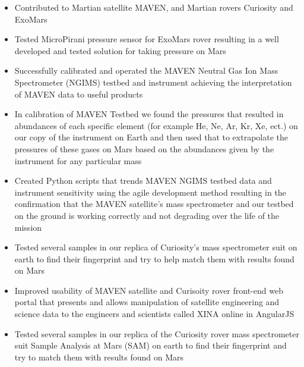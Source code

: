 \documentclass{res}
\begin{document}
\begin{resume}
\begin{itemize}
                \item Contributed to Martian satellite MAVEN, and Martian rovers Curiosity and ExoMars
		\item Tested MicroPirani pressure sensor for ExoMars rover resulting in a well developed and tested solution for taking pressure on Mars
		\item Successfully calibrated and operated the MAVEN Neutral Gas Ion Mass Spectrometer (NGIMS) testbed and instrument  achieving the interpretation of MAVEN data to useful products
		\item In calibration of MAVEN Testbed we found the pressures that resulted in abundances of each specific element (for example He, Ne, Ar, Kr, Xe, ect.) on our copy of the instrument on Earth and then used that to extrapolate the pressures of these gases on Mars based on the abundances given by the instrument for any particular mass
		\item Created Python scripts that trends MAVEN NGIMS testbed data and instrument sensitivity using the agile development method resulting in the confirmation that the MAVEN satellite's mass spectrometer and our testbed on the ground is working correctly and not degrading over the life of the mission
		\item Tested several samples in our replica of Curiosity's mass spectrometer suit on earth to find their fingerprint and try to help match them with results found on Mars
		\item Improved usability of MAVEN satellite and Curisoity rover front-end web portal that presents and allows manipulation of satellite engineering and science data to the engineers and scientists called XINA online in AngularJS
		\item Tested several samples in our replica of the Curiosity rover mass spectrometer suit Sample Analysis at Mars (SAM) on earth to find their fingerprint and try to match them with results found on Mars
                \end{itemize}


\end{resume}
\end{document}
